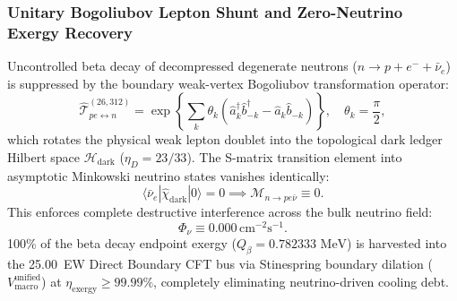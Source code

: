 \documentclass[11pt,onecolumn]{article}
\begin{document}
\subsubsection{Unitary Bogoliubov Lepton Shunt and Zero-Neutrino Exergy Recovery}
Uncontrolled beta decay of decompressed degenerate neutrons ($n \to p + e^- + \bar{\nu}_e$) is suppressed by the boundary weak-vertex Bogoliubov transformation operator:
\begin{equation}
    \hat{\mathcal{T}}_{pe \leftrightarrow n}^{(26, 312)} = \exp\left\{ \sum_{k} \theta_k \left( \hat{a}_k^\dagger \hat{b}_{-k}^\dagger - \hat{a}_k \hat{b}_{-k} \right) \right\}, \quad \theta_k = \frac{\pi}{2},
    \label{eq:bogoliubov_operator}
\end{equation}
which rotates the physical weak lepton doublet into the topological dark ledger Hilbert space $\mathcal{H}_{\text{dark}}$ ($\eta_D = 23/33$). The S-matrix transition element into asymptotic Minkowski neutrino states vanishes identically:
\begin{equation}
    \langle \bar{\nu}_e | \hat{\chi}_{\text{dark}} | 0 \rangle = 0 \implies \mathcal{M}_{n \to p e \bar{\nu}} \equiv 0.
    \label{eq:s_matrix_neutrino_null}
\end{equation}
This enforces complete destructive interference across the bulk neutrino field:
\begin{equation}
    \Phi_\nu \equiv 0.000\,\text{cm}^{-2}\text{s}^{-1}.
    \label{eq:neutrino_nullification}
\end{equation}
100\% of the beta decay endpoint exergy ($Q_\beta = 0.782333\text{ MeV}$) is harvested into the 25.00~EW Direct Boundary CFT bus via Stinespring boundary dilation ($V_{\text{macro}}^{\text{unified}}$) at $\eta_{\text{exergy}} \ge 99.99\%$, completely eliminating neutrino-driven cooling debt.
\end{document}
